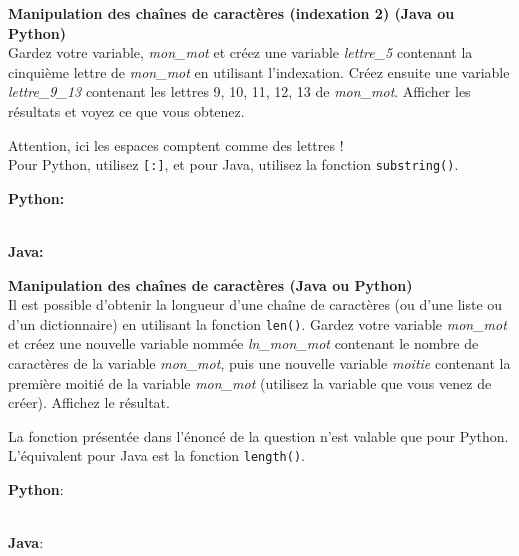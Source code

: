 \begin{Exercice}[5 minutes] \textbf{Manipulation des chaînes de caractères (indexation 2) (Java ou Python)}\\
   Gardez votre variable, \textit{mon\_mot} et créez une variable \textit{lettre\_5} contenant la cinquième lettre de \textit{mon\_mot} en utilisant l'indexation. Créez ensuite une variable \textit{lettre\_9\_13} contenant les lettres 9, 10, 11, 12, 13 de \textit{mon\_mot}. Afficher les résultats et voyez ce que vous obtenez.  \\
   
    \begin{conseil}
      	Attention, ici les espaces comptent comme des lettres ! \\

		Pour Python, utilisez \lstinline{[:]}, et pour Java, utilisez la fonction \lstinline{substring()}.
        
    \end{conseil}
    \begin{solution}
    
    \textbf{Python:}    
    
    
    \textbf{\\Java:}
    
           
    \end{solution}   
\end{Exercice}
\begin{Exercice}[10 minutes] \textbf{Manipulation des chaînes de caractères (Java ou Python) \optionnel}\\
   Il est possible d'obtenir la longueur d'une chaîne de caractères (ou d'une liste ou d'un dictionnaire) en utilisant la fonction \lstinline{len()}. Gardez votre variable \textit{mon\_mot} et créez une nouvelle variable nommée \textit{ln\_mon\_mot} contenant le nombre de caractères de la variable \textit{mon\_mot}, puis une nouvelle variable \textit{moitie} contenant la première moitié de la variable \textit{mon\_mot} (utilisez la variable que vous venez de créer). Affichez le résultat.   \\
   
    \begin{conseil}
      	La fonction présentée dans l'énoncé de la question n'est valable que pour Python. L'équivalent pour Java est la fonction \lstinline{length()}.
        
    \end{conseil}
    \begin{solution}
    
    \textbf{Python}:
    
    
    \textbf{\\Java}:
    
    \end{solution}   
\end{Exercice}

